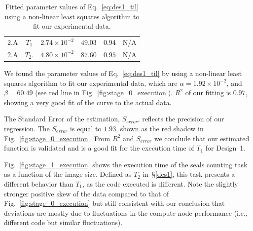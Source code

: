 \begin{table}[t]
\begin{tabular}{@{}cclrcl@{}}
        2.A                                            &
        $T_{1}$                                        &
        $2.74\times 10^{-2}$                           &
        $49.03$                                        &
        $0.94$                                         &
        N/A     \\
        2.A                                            &
        $T_{2}$.                                        &
        $4.80\times 10^{-2}$                           &
        $87.60$                                        &
        $0.95$                                         &
        N/A   \\
		\bottomrule
    \end{tabular}
    \caption{Fitted parameter values of Eq.~\ref{eq:des1_til} using a
             non-linear least squares algorithm to fit our experimental
             data.}\label{tab:fit_par_val}
\end{table}

We found the parameter values of Eq.~\ref{eq:des1_til} by using a non-linear least squares algorithm to fit our experimental data, which are $\alpha= 1.92 \times 10^{-2}$, and $\beta = 60.49$ (see red line in Fig.~\ref{fig:stage_0_execution}).
$R^{2}$ of our fitting is $0.97$, showing a very good fit of the curve to the actual data.

The Standard Error of the estimation, $S_{error}$, reflects the precision of our regression.
The $S_{error}$ is equal to $1.93$, shown as the red shadow in Fig.~\ref{fig:stage_0_execution}.
From $R^{2}$ and $S_{error}$ we conclude that our estimated function is validated and is a good fit for the execution time of $T_{1}$ for Design~1.


Fig.~\ref{fig:stage_1_execution} shows the execution time of the seals counting task as a function of the image size.
Defined as $T_{2}$ in~\S\ref{des1}, this task presents a different behavior than $T_{1}$, as the code executed is different.
Note the slightly stronger positive skew of the data compared to that of Fig.~\ref{fig:stage_0_execution} but still consistent with our conclusion that deviations are mostly due to fluctuations in the compute node performance (i.e., different code but similar fluctuations).

